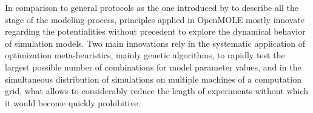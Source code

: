 \documentclass[10pt]{article}
\begin{document}
In comparison to general protocols as the one introduced by \cite{} to describe all the stage of the modeling process, principles applied in OpenMOLE mostly innovate regarding the potentialities without precedent to explore the dynamical behavior of simulation models. Two main innovations rely in the systematic application of optimization meta-heuristics, mainly genetic algorithms, to rapidly test the largest possible number of combinations for model parameter values, and in the simultaneous distribution of simulations on multiple machines of a computation grid, what allows to considerably reduce the length of experiments without which it would become quickly prohibitive.
\end{document}
